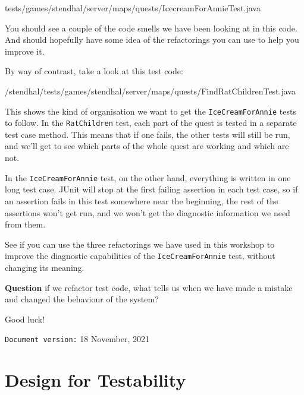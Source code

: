 \documentclass[
]{book}
\newenvironment{Shaded}{\begin{snugshade}}{\end{snugshade}}
\newcommand{\FunctionTok}[1]{\textcolor[rgb]{0.00,0.00,0.00}{#1}}
\newcommand{\NormalTok}[1]{#1}
\begin{document}
\begin{Shaded}
\begin{Highlighting}[]
\NormalTok{tests/games/stendhal/server/maps/quests/IcecreamForAnnieTest.}\FunctionTok{java}
\end{Highlighting}
\end{Shaded}

You should see a couple of the code smells we have been looking at in this code. And should hopefully have some idea of the refactorings you can use to help you improve it.

By way of contrast, take a look at this test code:

\begin{Shaded}
\begin{Highlighting}[]
\NormalTok{/stendhal/tests/games/stendhal/server/maps/quests/FindRatChildrenTest.}\FunctionTok{java}
\end{Highlighting}
\end{Shaded}

This shows the kind of organisation we want to get the \texttt{IceCreamForAnnie} tests to follow. In the \texttt{RatChildren} test, each part of the quest is tested in a separate test case method. This means that if one fails, the other tests will still be run, and we'll get to see which parts of the whole quest are working and which are not.

In the \texttt{IceCreamForAnnie} test, on the other hand, everything is written in one long test case. JUnit will stop at the first failing assertion in each test case, so if an assertion fails in this test somewhere near the beginning, the rest of the assertions won't get run, and we won't get the diagnostic information we need from them.

See if you can use the three refactorings we have used in this workshop to improve the diagnostic capabilities of the \texttt{IceCreamForAnnie} test, without changing its meaning.

\textbf{Question} if we refactor test code, what tells us when we have made a mistake and changed the behaviour of the system?

Good luck!

\texttt{Document\ version:} 18 November, 2021

\hypertarget{designing}{%
\chapter{Design for Testability}\label{designing}}
\end{document}
